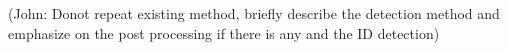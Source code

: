 \documentclass[journal]{IEEEtran}
\begin{document}
%

(John: Donot repeat existing method, briefly describe the detection method and emphasize on the post processing if there is any and the ID detection)







\end{document}
